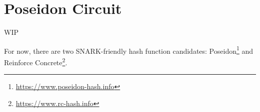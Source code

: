 \section{Poseidon Circuit}
\label{section:poseidon}

WIP

For now, there are two SNARK-friendly hash function candidates: Poseidon\footnote{\url{https://www.poseidon-hash.info}} and Reinforce Concrete\footnote{\url{https://www.rc-hash.info}}. 